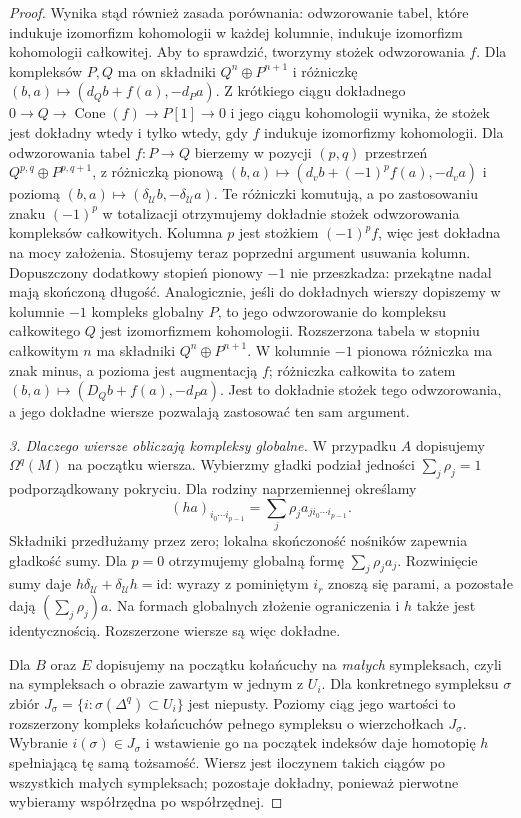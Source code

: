 \documentclass[11pt,a4paper,oneside]{report}
\newcommand{\id}{\mathrm{id}}
\theoremstyle{plain}
\theoremstyle{definition}
\theoremstyle{remark}
\begin{document}
\begin{proof}
Wynika stąd również zasada porównania: odwzorowanie
tabel, które indukuje izomorfizm kohomologii w każdej
kolumnie, indukuje izomorfizm kohomologii całkowitej.
Aby to sprawdzić, tworzymy stożek odwzorowania $f$.
Dla kompleksów $P,Q$ ma on składniki
$Q^n\oplus P^{n+1}$ i różniczkę
$(b,a)\mapsto(d_Qb+f(a),-d_Pa)$.
Z krótkiego ciągu dokładnego
$0\to Q\to\operatorname{Cone}(f)\to P[1]\to0$
i jego ciągu kohomologii wynika, że stożek jest dokładny
wtedy i tylko wtedy, gdy $f$ indukuje izomorfizmy
kohomologii. Dla odwzorowania tabel $f:P\to Q$ bierzemy
w pozycji $(p,q)$ przestrzeń $Q^{p,q}\oplus P^{p,q+1}$,
z różniczką pionową
$(b,a)\mapsto(d_vb+(-1)^p f(a),-d_va)$
i poziomą $(b,a)\mapsto(\delta_{\mathcal U}b,-\delta_{\mathcal U}a)$.
Te różniczki komutują, a po zastosowaniu znaku $(-1)^p$
w totalizacji otrzymujemy dokładnie stożek odwzorowania
kompleksów całkowitych. Kolumna $p$ jest stożkiem
$(-1)^p f$, więc jest dokładna na mocy założenia.
Stosujemy teraz poprzedni argument usuwania kolumn.
Dopuszczony dodatkowy stopień pionowy $-1$ nie przeszkadza:
przekątne nadal mają skończoną długość. Analogicznie,
jeśli do dokładnych wierszy dopiszemy w kolumnie $-1$
kompleks globalny $P$, to jego odwzorowanie do kompleksu
całkowitego $Q$ jest izomorfizmem kohomologii.
Rozszerzona tabela w stopniu całkowitym $n$ ma składniki
$Q^n\oplus P^{n+1}$. W kolumnie $-1$ pionowa różniczka
ma znak minus, a pozioma jest augmentacją $f$;
różniczka całkowita to zatem
$(b,a)\mapsto(D_Qb+f(a),-d_Pa)$.
Jest to dokładnie stożek tego odwzorowania, a jego
dokładne wiersze pozwalają zastosować ten sam argument.

\emph{3. Dlaczego wiersze obliczają kompleksy globalne.}
W przypadku $A$ dopisujemy $\Omega^q(M)$ na początku
wiersza. Wybierzmy gładki podział jedności
$\sum_j\rho_j=1$ podporządkowany pokryciu. Dla rodziny
naprzemiennej określamy
\[
 (ha)_{i_0\cdots i_{p-1}}
   =\sum_j\rho_j a_{j i_0\cdots i_{p-1}}.
\]
Składniki przedłużamy przez zero; lokalna skończoność
nośników zapewnia gładkość sumy. Dla $p=0$ otrzymujemy
globalną formę $\sum_j\rho_j a_j$.
Rozwinięcie sumy daje
$h\delta_{\mathcal U}+\delta_{\mathcal U}h=\id$:
wyrazy z pominiętym $i_r$ znoszą się parami, a pozostałe
dają $(\sum_j\rho_j)a$. Na formach globalnych złożenie
ograniczenia i $h$ także jest identycznością.
Rozszerzone wiersze są więc dokładne.

Dla $B$ oraz $E$ dopisujemy na początku kołańcuchy
na \emph{małych} sympleksach, czyli na sympleksach
o obrazie zawartym w jednym z $U_i$. Dla konkretnego
sympleksu $\sigma$ zbiór
$J_\sigma=\{i:\sigma(\Delta^q)\subset U_i\}$ jest
niepusty. Poziomy ciąg jego wartości to rozszerzony
kompleks kołańcuchów pełnego sympleksu o wierzchołkach
$J_\sigma$. Wybranie $i(\sigma)\in J_\sigma$ i wstawienie
go na początek indeksów daje homotopię $h$ spełniającą
tę samą tożsamość. Wiersz jest iloczynem takich ciągów
po wszystkich małych sympleksach; pozostaje dokładny,
ponieważ pierwotne wybieramy współrzędna po współrzędnej.


\end{proof}
\end{document}
